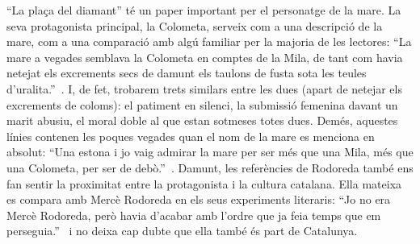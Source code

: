 ``La plaça del diamant'' té un paper important per el personatge de la mare.
La seva protagonista principal, la Colometa, serveix com a una descripció de la mare, com a una comparació amb algú familiar per la majoria de les lectores:
``La mare a vegades semblava la Colometa en comptes de la Mila, de tant com havia netejat els excrements secs de damunt els taulons de fusta sota les teules d'uralita.''~\autocite[199]{ElHachmi2008}.
I, de fet, trobarem trets similars entre les dues (apart de netejar els excrements de coloms): el patiment en silenci, la submissió femenina davant un marit abusiu, el moral doble al que estan sotmeses totes dues.
Demés, aquestes línies contenen les poques vegades quan el nom de la mare es menciona en absolut:
``Una estona i jo vaig admirar la mare per ser més que una Mila, més que una Colometa, per ser de debò.''~\autocite[223]{ElHachmi2008}.
Damunt, les referències de Rodoreda també ens fan sentir la proximitat entre la protagonista i la cultura catalana.
Ella mateixa es compara amb Mercè Rodoreda en els seus experiments literaris: ``Jo no era Mercè Rodoreda, però havia d'acabar amb l'ordre que ja feia temps que em perseguia.''~\autocite[331]{ElHachmi2008} i no deixa cap dubte que ella també és part de Catalunya.

